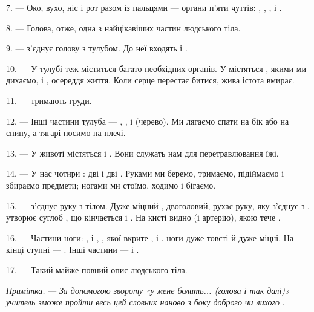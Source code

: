 7. --- Око, вухо, ніс і рот разом із пальцями --- органи п'яти чуттів:
, , ,  і
.

8. --- Голова, отже, одна з найцікавіших частин людського тіла.

\VUsaut{4.4mm}
\VUsaut{3.0mm}

9. ---  з'єднує голову з тулубом. До неї входять  і
.

10. --- У тулубі теж міститься багато необхідних органів. У 
містяться , якими ми дихаємо, і , осереддя життя.
Коли серце перестає битися, жива істота вмирає.

11. ---  тримають груди.

12. --- Інші частини тулуба --- , ,  і
 (черево). Ми лягаємо спати на бік або на спину, а тягарі носимо
на плечі.

13. --- У животі містяться  і . Вони служать нам
для перетравлювання їжі.

\VUsaut{4.4mm}
\VUsaut{3.0mm}

14. --- У нас чотири : дві  і дві .
Руками ми беремо, тримаємо, підіймаємо і збираємо предмети; ногами ми стоїмо,
ходимо і бігаємо.

15. ---  з'єднує руку з тілом. Дуже міцний ,
двоголовий, рухає руку, яку  з'єднує з .
 утворює суглоб , що кінчається
 і . На кисті видно  (і
артерію), якою тече .

16. --- Частини ноги: ,  і , ,  якої вкрите ,
 і .  ноги дуже товсті й дуже
міцні. На кінці ступні --- . Інші частини ---
 і .

17. --- Такий майже повний опис людського тіла.

\textit{Примітка.} --- \textit{За допомогою звороту «у мене болить...
(голова і так далі)» учитель зможе пройти весь цей словник наново з боку
доброго чи лихого} .


